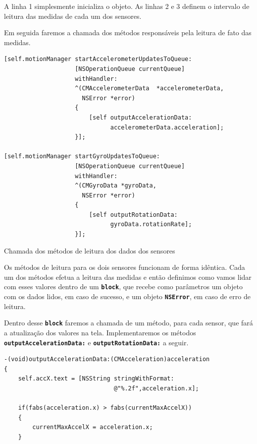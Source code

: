 \documentclass[a4paper,12pt,brazil,doubleside]{book}
\begin{document}
\begin{singlespace}
A linha 1 simplesmente inicializa o objeto. As linhas 2 e 3 definem o intervalo de leitura das medidas de cada um dos sensores.

Em seguida faremos a chamada dos métodos responsáveis pela leitura de fato das medidas.

\begin{listing}[H]
\begin{verbatim}
[self.motionManager startAccelerometerUpdatesToQueue:
                    [NSOperationQueue currentQueue]
                    withHandler:
                    ^(CMAccelerometerData  *accelerometerData,
                      NSError *error)
                    {
                    	[self outputAccelerationData:
                    	      accelerometerData.acceleration];
                    }];
    
[self.motionManager startGyroUpdatesToQueue:
                    [NSOperationQueue currentQueue]
                    withHandler:
                    ^(CMGyroData *gyroData,
                      NSError *error)
                    {
                    	[self outputRotationData:
                    	      gyroData.rotationRate];
                    }];
\end{verbatim}
\caption{Chamada dos métodos de leitura dos dados dos sensores}
\end{listing}


Os métodos de leitura para os dois sensores funcionam de forma idêntica. Cada um dos métodos efetua a leitura das medidas e então definimos como vamos lidar com esses valores dentro de um \texttt{\textbf{block}}, que recebe como parâmetros um objeto com os dados lidos, em caso de sucesso, e um objeto \texttt{\textbf{NSError}}, em caso de erro de leitura.

Dentro desse \texttt{\textbf{block}} faremos a chamada de um método, para cada sensor, que fará a atualização dos valores na tela. Implementaremos os métodos \texttt{\textbf{outputAccelerationData:}} e \texttt{\textbf{outputRotationData:}} a seguir.

\begin{listing}[H]
\begin{verbatim}
-(void)outputAccelerationData:(CMAcceleration)acceleration
{
    self.accX.text = [NSString stringWithFormat:
                               @"%.2f",acceleration.x];
    
    if(fabs(acceleration.x) > fabs(currentMaxAccelX))
    {
        currentMaxAccelX = acceleration.x;
    }
    

\end{verbatim}
\end{listing}
\end{singlespace}
\end{document}

